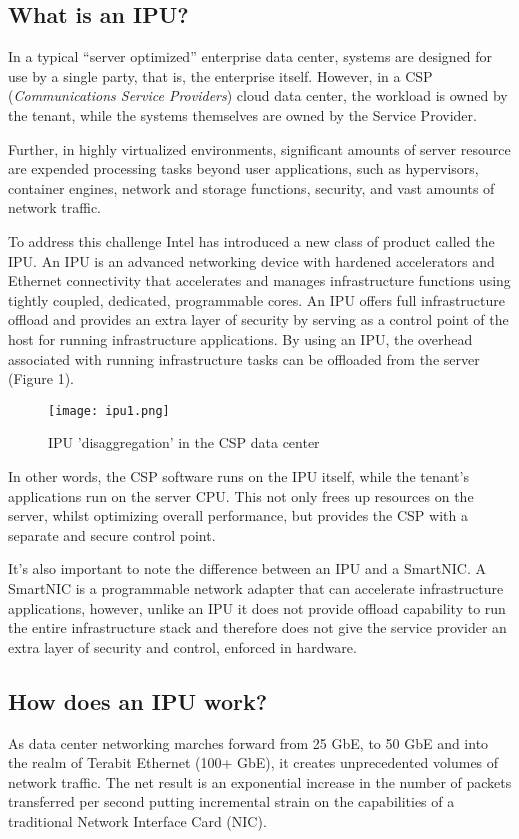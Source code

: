 \documentclass[../sn.tex]{subfiles}
\begin{document}
\subsection{What is an IPU?}
In a typical “server optimized” enterprise data center, systems
are designed for use by a single party, that is, the enterprise itself.
However, in a CSP (\textit{Communications Service Providers}) cloud data center, the workload is owned by
the tenant, while the systems themselves are owned by the
Service Provider.

Further, in highly virtualized environments, significant amounts
of server resource are expended processing tasks beyond user
applications, such as hypervisors, container engines, network
and storage functions, security, and vast amounts of network
traffic.

To address this challenge Intel has introduced a new class of
product called the IPU. An IPU is an advanced networking device
with hardened accelerators and Ethernet connectivity that
accelerates and manages infrastructure functions using tightly
coupled, dedicated, programmable cores. An IPU offers full
infrastructure offload and provides an extra layer of security by
serving as a control point of the host for running infrastructure
applications. By using an IPU, the overhead associated with running
infrastructure tasks can be offloaded from the server (Figure 1).
\begin{center}
    \begin{figure}
        \caption{IPU 'disaggregation' in the CSP data center}
        \texttt{[image: ipu1.png]}
    \end{figure}
\end{center}
In other words, the CSP software runs on the IPU itself, while the
tenant's applications run on the server CPU. This not only frees
up resources on the server, whilst optimizing overall
performance, but provides the CSP with a separate and secure
control point.

It's also important to note the difference between an IPU and
a SmartNIC. A SmartNIC is a programmable network adapter
that can accelerate infrastructure applications, however,
unlike an IPU it does not provide offload capability to run the
entire infrastructure stack and therefore does not give the
service provider an extra layer of security and control,
enforced in hardware.

\subsection{How does an IPU work?}
As data center networking marches forward from 25 GbE, to 50
GbE and into the realm of Terabit Ethernet (100+ GbE), it creates
unprecedented volumes of network traffic. The net result is an
exponential increase in the number of packets transferred per
second putting incremental strain on the capabilities of a traditional
Network Interface Card (NIC).
\end{document}
